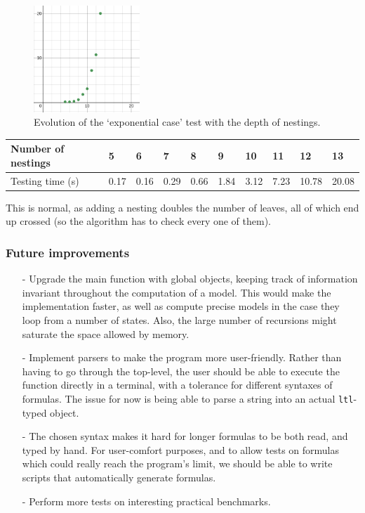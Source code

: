 \documentclass[11pt]{article}
\theoremstyle{definition}
\begin{document}
\begin{figure}[h!]\label{fig:graph_perf}
    \centering
    \includegraphics[width = 4cm]{graph_perf.png}
    \caption{Evolution of the `exponential case' test with the depth of nestings.}
\end{figure}
\begin{table}[h!]
    \centering
    \begin{tabular}{|l|l|l|l|l|l|l|l|l|l|}
    \hline
    Number of nestings & 5    & 6    & 7    & 8    & 9    & 10   & 11   & 12    & 13    \\ \hline
    Testing time (s)   & 0.17 & 0.16 & 0.29 & 0.66 & 1.84 & 3.12 & 7.23 & 10.78 & 20.08 \\ \hline
    \end{tabular}
\end{table}




This is normal, as adding a nesting doubles the number of leaves, 
all of which end up crossed (so the algorithm has to check every one of them).

\subsubsection*{Future improvements}
\begin{itemize}
    \item [-] Upgrade the main function with global objects, keeping track of information invariant throughout the computation of a model. This would make the implementation faster, as well as compute precise models in the case they loop from a number of states. Also, the large number of recursions might saturate the space allowed by memory.
    \item [-] Implement parsers to make the program more user-friendly. Rather than having to go through the top-level, the user should be able to execute the function directly in a terminal, with a tolerance for different syntaxes of formulas. The issue for now is being able to parse a string into an actual {\tt ltl}-typed object.
    \item [-] The chosen syntax makes it hard for longer formulas to be both read, and typed by hand. For user-comfort purposes, and to allow tests on formulas which could really reach the program's limit, we should be able to write scripts that automatically generate formulas.
    \item [-] Perform more tests on interesting practical benchmarks.
\end{itemize}
\end{document}
